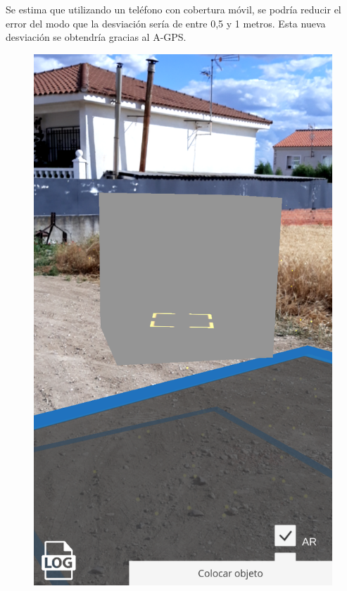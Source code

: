 Se estima que utilizando un teléfono con cobertura móvil, se podría reducir el error del modo que la desviación sería de entre 0,5 y 1 metros. Esta nueva desviación se obtendría gracias al A-GPS.

\begin{figure}[H]
\centering
    \hspace{-4mm}
    \begin{minipage}{0.5\textwidth}
        \centering
        \includegraphics[scale=0.25]{Images/PruebasMapbox/mapboxGPS (2).png}\\

\end{minipage}
\end{figure}

